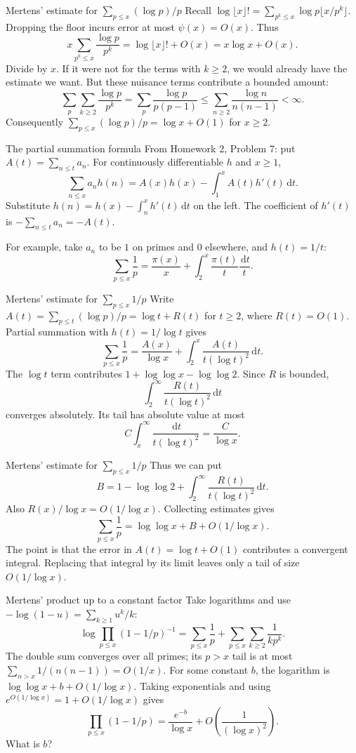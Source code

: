\documentclass[aspectratio=169,11pt]{beamer}
\newcommand{\dd}{\,\mathrm d}
\begin{document}
\begin{frame}{Mertens' estimate for $\sum_{p\le x}(\log p)/p$}
Recall $\log\lfloor x\rfloor!=\sum_{p^k\le x}\log p\lfloor x/p^k\rfloor$. Dropping the floor incurs error at most $\psi(x)=O(x)$. Thus
\[x\sum_{p^k\le x}\frac{\log p}{p^k}=\log\lfloor x\rfloor!+O(x)=x\log x+O(x).\]
Divide by $x$. If it were not for the terms with $k\ge2$, we would already have the estimate we want. But these nuisance terms contribute a bounded amount:
\[\sum_p\sum_{k\ge2}\frac{\log p}{p^k}=\sum_p\frac{\log p}{p(p-1)}\le\sum_{n\ge2}\frac{\log n}{n(n-1)}<\infty.\]
Consequently $\sum_{p\le x}(\log p)/p=\log x+O(1)$ for $x\ge2$.
\end{frame}
\begin{frame}{The partial summation formula}
From Homework 2, Problem 7: put $A(t)=\sum_{n\le t}a_n$. For continuously differentiable $h$ and $x\ge1$,
\[\sum_{n\le x}a_nh(n)=A(x)h(x)-\int_1^x A(t)h'(t)\dd t.\]
Substitute $h(n)=h(x)-\int_n^x h'(t)\dd t$ on the left. The coefficient of $h'(t)$ is $-\sum_{n\le t}a_n=-A(t)$.

For example, take $a_n$ to be $1$ on primes and $0$ elsewhere, and $h(t)=1/t$:
\[\sum_{p\le x}\frac1p=\frac{\pi(x)}x+\int_2^x\frac{\pi(t)}t\frac{\dd t}t.\]
\end{frame}
\begin{frame}{Mertens' estimate for $\sum_{p\le x}1/p$}
Write $A(t)=\sum_{p\le t}(\log p)/p=\log t+R(t)$ for $t\ge2$, where $R(t)=O(1)$. Partial summation with $h(t)=1/\log t$ gives
\[\sum_{p\le x}\frac1p=\frac{A(x)}{\log x}+\int_2^x\frac{A(t)}{t(\log t)^2}\dd t.\]
The $\log t$ term contributes $1+\log\log x-\log\log2$. Since $R$ is bounded,
\[\int_2^\infty\frac{R(t)}{t(\log t)^2}\dd t\]
converges absolutely. Its tail has absolute value at most
\[C\int_x^\infty\frac{\dd t}{t(\log t)^2}=\frac{C}{\log x}.\]
\end{frame}
\begin{frame}{Mertens' estimate for $\sum_{p\le x}1/p$}
Thus we can put
\[B=1-\log\log2+\int_2^\infty\frac{R(t)}{t(\log t)^2}\dd t.\]
Also $R(x)/\log x=O(1/\log x)$. Collecting estimates gives
\[\sum_{p\le x}\frac1p=\log\log x+B+O(1/\log x).\]
The point is that the error in $A(t)=\log t+O(1)$ contributes a convergent integral. Replacing that integral by its limit leaves only a tail of size $O(1/\log x)$.
\end{frame}
\begin{frame}{Mertens' product up to a constant factor}
Take logarithms and use $-\log(1-u)=\sum_{k\ge1}u^k/k$:
\[\log\prod_{p\le x}(1-1/p)^{-1}=\sum_{p\le x}\frac1p+\sum_{p\le x}\sum_{k\ge2}\frac1{kp^k}.\]
The double sum converges over all primes; its $p>x$ tail is at most $\sum_{n>x}1/(n(n-1))=O(1/x)$. For some constant $b$, the logarithm is $\log\log x+b+O(1/\log x)$. Taking exponentials and using $e^{O(1/\log x)}=1+O(1/\log x)$ gives
\[\prod_{p\le x}(1-1/p)=\frac{e^{-b}}{\log x}+O\left(\frac1{(\log x)^2}\right).\]
What is $b$?
\end{frame}
\end{document}
